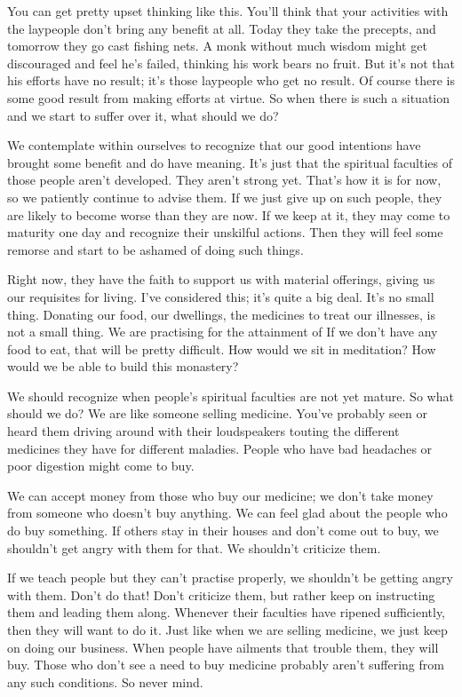 You can get pretty upset thinking like this. You'll think that your activities with the laypeople don't bring any benefit at all. Today they take the precepts, and tomorrow they go cast fishing nets. A monk without much wisdom might get discouraged and feel he's failed, thinking his work bears no fruit. But it's not that his efforts have no result; it's those laypeople who get no result. Of course there is some good result from making efforts at virtue. So when there is such a situation and we start to suffer over it, what should we do?

We contemplate within ourselves to recognize that our good intentions have brought some benefit and do have meaning. It's just that the spiritual faculties of those people aren't developed. They aren't strong yet. That's how it is for now, so we patiently continue to advise them. If we just give up on such people, they are likely to become worse than they are now. If we keep at it, they may come to maturity one day and recognize their unskilful actions. Then they will feel some remorse and start to be ashamed of doing such things.

Right now, they have the faith to support us with material offerings, giving us our requisites for living. I've considered this; it's quite a big deal. It's no small thing. Donating our food, our dwellings, the medicines to treat our illnesses, is not a small thing. We are practising for the attainment of  If we don't have any food to eat, that will be pretty difficult. How would we sit in meditation? How would we be able to build this monastery?

We should recognize when people's spiritual faculties are not yet mature. So what should we do? We are like someone selling medicine. You've probably seen or heard them driving around with their loudspeakers touting the different medicines they have for different maladies. People who have bad headaches or poor digestion might come to buy.

We can accept money from those who buy our medicine; we don't take money from someone who doesn't buy anything. We can feel glad about the people who do buy something. If others stay in their houses and don't come out to buy, we shouldn't get angry with them for that. We shouldn't criticize them.

If we teach people but they can't practise properly, we shouldn't be getting angry with them. Don't do that! Don't criticize them, but rather keep on instructing them and leading them along. Whenever their faculties have ripened sufficiently, then they will want to do it. Just like when we are selling medicine, we just keep on doing our business. When people have ailments that trouble them, they will buy. Those who don't see a need to buy medicine probably aren't suffering from any such conditions. So never mind. 

